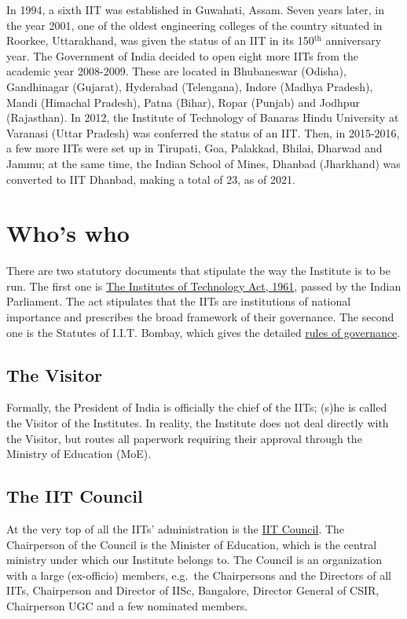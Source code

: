 \documentclass[
  10pt,
  a5paper,
  10pt,
  openany]{amsbook}
\begin{document}
In 1994, a sixth IIT was established in Guwahati, Assam. Seven years
later, in the year 2001, one of the oldest engineering colleges of the
country situated in Roorkee, Uttarakhand, was given the status of an IIT
in its 150\(^{\text{th}}\) anniversary year. The Government of India
decided to open eight more IITs from the academic year 2008-2009. These
are located in Bhubaneswar (Odisha), Gandhinagar (Gujarat), Hyderabad
(Telengana), Indore (Madhya Pradesh), Mandi (Himachal Pradesh), Patna
(Bihar), Ropar (Punjab) and Jodhpur (Rajasthan). In 2012, the Institute
of Technology of Banaras Hindu University at Varanasi (Uttar Pradesh)
was conferred the status of an IIT. Then, in 2015-2016, a few more IITs
were set up in Tirupati, Goa, Palakkad, Bhilai, Dharwad and Jammu; at
the same time, the Indian School of Mines, Dhanbad (Jharkhand) was
converted to IIT Dhanbad, making a total of 23, as of 2021.

\section{Who's who}\label{whos-who}

There are two statutory documents that stipulate the way the Institute
is to be run. The first one is
\href{https://www.iitb.ac.in/sites/www.iitb.ac.in/files/2023-10/IITsAct_1.pdf}{The
Institutes of Technology Act, 1961}, passed by the Indian Parliament.
The act stipulates that the IITs are institutions of national importance
and prescribes the broad framework of their governance. The second one
is the Statutes of I.I.T. Bombay, which gives the detailed
\href{https://www.iitb.ac.in/sites/www.iitb.ac.in/files/IITBStatutes.pdf}{rules
of governance}.

\subsection{The Visitor}\label{the-visitor}

Formally, the President of India is officially the chief of the IITs;
(s)he is called the Visitor of the Institutes. In reality, the Institute
does not deal directly with the Visitor, but routes all paperwork
requiring their approval through the Ministry of Education (MoE).

\subsection{The IIT Council}\label{the-iit-council}

At the very top of all the IITs' administration is the
\href{https://www.iitsystem.ac.in}{IIT Council}. The Chairperson of the
Council is the Minister of Education, which is the central ministry
under which our Institute belongs to. The Council is an organization
with a large (ex-officio) members, e.g.~the Chairpersons and the
Directors of all IITs, Chairperson and Director of IISc, Bangalore,
Director General of CSIR, Chairperson UGC and a few nominated members.
\end{document}
